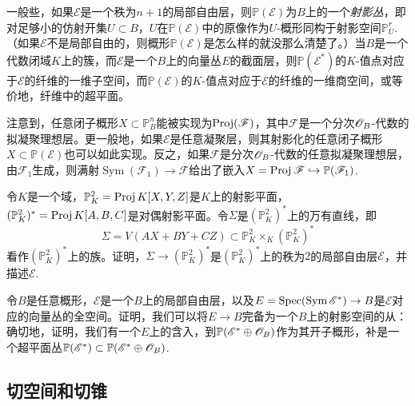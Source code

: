 一般些，如果$\mathscr E$是一个秩为$n+1$的局部自由层，则$\mathbb P(\mathscr E)$为$B$上的一个\textit{射影丛}，即对足够小的仿射开集$U\subset B$，$U$在$\mathbb P(\mathscr E)$中的原像作为$U$-概形同构于射影空间$\mathbb P_U^r$. （如果$\mathscr E$不是局部自由的，则概形$\mathbb P(\mathscr E)$是怎么样的就没那么清楚了。）当$B$是一个代数闭域$K$上的簇，而$\mathscr E$是一个$B$上的向量丛$E$的截面层，则$\mathbb P(\mathscr E^*)$的$K$-值点对应于$\mathscr E$的纤维的一维子空间，而$\mathbb P(\mathscr E)$的$K$-值点对应于$\mathscr E$的纤维的一维商空间，或等价地，纤维中的超平面。

注意到，任意闭子概形$X\subset \mathbb P_B^n$能被实现为$\operatorname{Proj}(\mathscr F)$，其中$\mathscr F$是一个分次$\mathscr{O}_B$-代数的拟凝聚理想层。更一般地，如果$\mathscr E$是任意凝聚层，则其射影化的任意闭子概形$X\subset \mathbb P(\mathscr E)$也可以如此实现。反之，如果$\mathscr F$是分次$\mathscr{O}_B$-代数的任意拟凝聚理想层，由$\mathscr F_1$生成，则满射$\operatorname{Sym}(\mathscr F_1)\to \mathscr F$给出了嵌入$X=\operatorname{Proj} \mathscr F\hookrightarrow \mathbb P(\mathscr F_1)$.

\begin{exe}\label{exe:3.25}
	令$K$是一个域，$\mathbb P_K^2=\operatorname{Proj} K[X,Y,Z]$是$K$上的射影平面，$(\mathbb P_K^2)^*=\operatorname{Proj} K[A,B,C]$是对偶射影平面。令$\Sigma$是$(\mathbb P_K^2)^*$上的万有直线，即
	\[
		\Sigma=V(AX+BY+CZ)\subset \mathbb P_K^2\times_K (\mathbb P_K^2)^*
	\]
	看作$(\mathbb P_K^2)^*$上的族。证明，$\Sigma\to (\mathbb P_K^2)^*$是$(\mathbb P_K^2)^*$上的秩为$2$的局部自由层$\mathscr E$，并描述$\mathscr E$.
\end{exe}

\begin{exe}\label{exe:3.26}
	令$B$是任意概形，$\mathscr E$是一个$B$上的局部自由层，以及$E=\operatorname{Spec} (\operatorname{Sym}\mathscr E^*)\to B$是$\mathscr E$对应的向量丛的全空间。证明，我们可以将$E\to B$完备为一个$B$上的射影空间的从：确切地，证明，我们有一个$E$上的含入，到$\mathbb P(\mathscr E^*\oplus \mathscr{O}_B)$作为其开子概形，补是一个超平面丛$\mathbb P(\mathscr E^*)\subset \mathbb P(\mathscr E^*\oplus \mathscr{O}_B)$.
\end{exe}


\subsection{切空间和切锥} \label{s:3.2.4}
